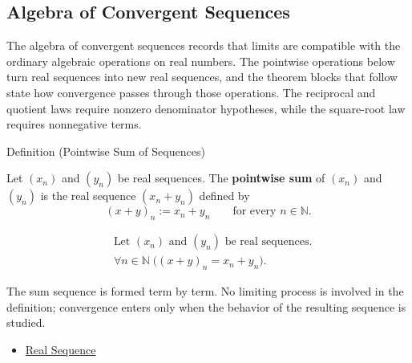 \subsection*{Algebra of Convergent Sequences}

\begin{exposition}
The algebra of convergent sequences records that limits are compatible with the
ordinary algebraic operations on real numbers. The pointwise operations below
turn real sequences into new real sequences, and the theorem blocks that follow
state how convergence passes through those operations. The reciprocal and
quotient laws require nonzero denominator hypotheses, while the square-root
law requires nonnegative terms.
\end{exposition}


\begin{definitionbox}{Definition (Pointwise Sum of Sequences)}
\begin{definition}
\label{def:pointwise-sum-sequence}
Let $(x_n)$ and $(y_n)$ be real sequences. The \textbf{pointwise sum}
of $(x_n)$ and $(y_n)$ is the real sequence $(x_n+y_n)$ defined by
\[
(x+y)_n := x_n+y_n
\qquad
\text{for every } n\in\mathbb{N}.
\]
\end{definition}
\end{definitionbox}

\begin{remark*}
\[
\begin{aligned}
&\text{Let } (x_n) \text{ and } (y_n) \text{ be real sequences.}\\
&\forall n\in\mathbb{N}\;\bigl((x+y)_n=x_n+y_n\bigr).
\end{aligned}
\]
\end{remark*}

\begin{remark*}[Interpretation]
The sum sequence is formed term by term. No limiting process is involved in
the definition; convergence enters only when the behavior of the resulting
sequence is studied.
\end{remark*}

\begin{dependencies}
\begin{itemize}
  \item \hyperref[def:real-sequence]{Real Sequence}
\end{itemize}
\end{dependencies}

